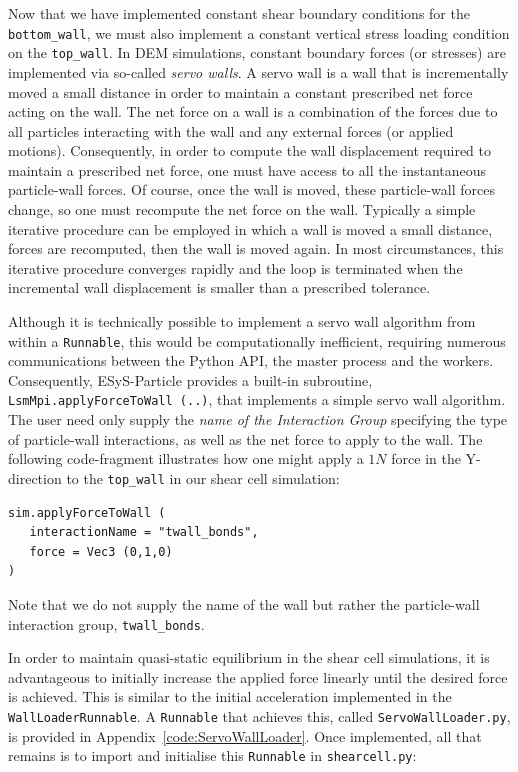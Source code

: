 Now that we have implemented constant shear boundary conditions for the \texttt{bottom\_\+wall}, we must also implement a constant vertical stress loading condition on the \texttt{top\_wall}. In DEM simulations, constant boundary forces (or stresses) are implemented via so-called \emph{servo walls}. A servo wall is a wall that is incrementally moved a small distance in order to maintain a constant prescribed net force acting on the wall. The net force on a wall is a combination of the forces due to all particles interacting with the wall and any external forces (or applied motions). Consequently, in order to compute the wall displacement required to maintain a prescribed net force, one must have access to all the instantaneous particle-wall forces. Of course, once the wall is moved, these particle-wall forces change, so one must recompute the net force on the wall. Typically a simple iterative procedure can be employed in which a wall is moved a small distance, forces are recomputed, then the wall is moved 
again. In most circumstances, this iterative procedure converges rapidly and the loop is terminated when the incremental wall displacement is smaller than a prescribed tolerance. 

Although it is technically possible to implement a servo wall algorithm from within a \texttt{Runnable}, this would be computationally inefficient, requiring numerous communications between the Python API, the master process and the workers. Consequently, ESyS-Particle provides a built-in subroutine, \texttt{LsmMpi.applyForceToWall (..)}, that implements a simple servo wall algorithm. The user need only supply the \emph{name of the Interaction Group} specifying the type of particle-wall interactions, as well as the net force to apply to the wall. The following code-fragment illustrates how one might apply a $1N$ force in the Y-direction to the \texttt{top\_wall} in our shear cell simulation:

\begin{verbatim}
sim.applyForceToWall (
   interactionName = "twall_bonds", 
   force = Vec3 (0,1,0)
)
\end{verbatim}

\noindent 
Note that we do not supply the name of the wall but rather the particle-wall interaction group, \texttt{twall\_bonds}.

In order to maintain quasi-static equilibrium in the shear cell simulations, it is advantageous to initially increase the applied force linearly until the desired force is achieved. This is similar to the initial acceleration implemented in the \texttt{WallLoaderRunnable}. A \texttt{Runnable} that achieves this, called \texttt{ServoWallLoader.py}, is provided in Appendix~\ref{code:ServoWallLoader}. Once implemented, all that remains is to import and initialise this \texttt{Runnable} in \texttt{shearcell\+.py}:

